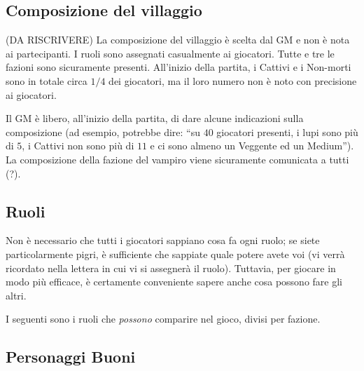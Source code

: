 \documentclass[a4paper,10pt]{article}
\begin{document}
\subsection{Composizione del villaggio}

(DA RISCRIVERE)
La composizione del villaggio è scelta dal GM e non è nota ai partecipanti. I ruoli sono assegnati casualmente ai giocatori.
Tutte e tre le fazioni sono sicuramente presenti. All'inizio della partita, i Cattivi e i Non-morti sono in totale circa $1/4$ dei giocatori, ma il loro numero non è noto con precisione ai giocatori.

Il GM è libero, all'inizio della partita, di dare alcune indicazioni sulla composizione (ad esempio, potrebbe dire: ``su $40$ giocatori presenti, i lupi sono più di $5$, i Cattivi non sono più di $11$ e ci sono almeno un Veggente ed un Medium''). La composizione della fazione del vampiro viene sicuramente comunicata a tutti (?).


\subsection{Ruoli}

Non è necessario che tutti i giocatori sappiano cosa fa ogni ruolo; se siete particolarmente pigri, è sufficiente che sappiate quale potere avete voi (vi verrà ricordato nella lettera in cui vi si assegnerà il ruolo). Tuttavia, per giocare in modo più efficace, è certamente conveniente sapere anche cosa possono fare gli altri.


I seguenti sono i ruoli che \emph{possono} comparire nel gioco, divisi per fazione.


\subsection*{Personaggi Buoni}
\end{document}
